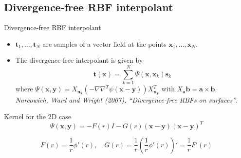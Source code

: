 \documentclass{beamer}
\begin{document}
\subsection{Divergence-free RBF interpolant}
\begin{frame}{Divergence-free RBF interpolant}
  \begin{itemize}
    \item $\mathbf{t}_1,\ldots,\mathbf{t}_N$ are samples of a vector field at
      the points $\mathbf{x}_1,\ldots,\mathbf{x}_N$.
      
    \item The divergence-free interpolant is given by
      \begin{equation*}
	\mathbf{t}(\mathbf{x}) = \sum_{k = 1}^{N}
	{\Psi(\mathbf{x},\mathbf{x}_k)\mathbf{s}_k}
      \end{equation*}
      where $\Psi(\mathbf{x},\mathbf{y}) = X_\mathbf{n_x}
      (-\nabla\nabla^T\psi(\mathbf{x} - \mathbf{y}))X_{\mathbf{n_y}}^T$ with
      $X_\mathbf{a}\mathbf{b} = \mathbf{a}\times\mathbf{b}$. \emph{Narcowich,
      Ward and Wright (2007), ``Divergence-free RBFs on surfaces''}.
  \end{itemize}
\end{frame}

\begin{frame}{Kernel for the 2D case}
  \begin{equation*}
    \Psi(\mathbf{x},\mathbf{y}) = -F(r)I - G(r)(\mathbf{x} - 
    \mathbf{y})(\mathbf{x} - \mathbf{y})^T
  \end{equation*}

  \begin{equation*}
    F(r) = \frac{1}{r}\phi'(r), \quad G(r) = 
    \frac{1}{r}\left(\frac{1}{r}\phi'(r)\right)' = \frac{1}{r}F'(r)
  \end{equation*}
\end{frame}
\end{document}
